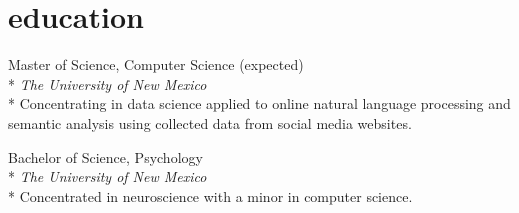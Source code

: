 \documentclass[]{friggeri-cv} %
\begin{document}
\section{education}
\begin{description}
  \item {\largeheaderfont Master of Science, Computer Science}  \hfill 
    { (expected)} \\*
    {\footnotesize \emph{The University of New Mexico  }} \\*
    Concentrating in data science applied to online natural language processing
    and semantic analysis using collected data from social media websites.
\end{description}
\begin{description}
  \item  {\largeheaderfont Bachelor of Science, Psychology } \hfill
    { }\\*
    {\footnotesize \emph{The University of New Mexico  }} \\*
    Concentrated in neuroscience with a minor in computer science.
\end{description}
\end{document}
